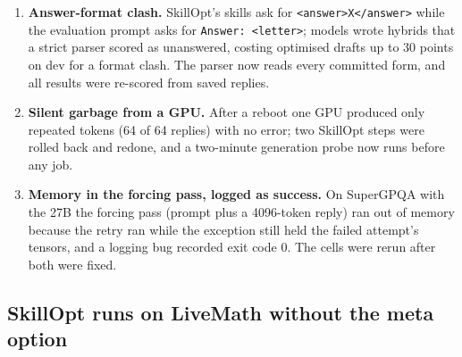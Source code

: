 \documentclass[11pt]{article}
\begin{document}
\begin{enumerate}
  \item \textbf{Answer-format clash.} SkillOpt's skills ask for \texttt{<answer>X</answer>} while the
  evaluation prompt asks for \texttt{Answer: <letter>}; models wrote hybrids that a strict parser
  scored as unanswered, costing optimised drafts up to 30 points on dev for a format clash. The
  parser now reads every committed form, and all results were re-scored from saved replies.
  \item \textbf{Silent garbage from a GPU.} After a reboot one GPU produced only repeated tokens
  (64 of 64 replies) with no error; two SkillOpt steps were rolled back and redone, and a two-minute
  generation probe now runs before any job.
  \item \textbf{Memory in the forcing pass, logged as success.} On SuperGPQA with the 27B the forcing
  pass (prompt plus a 4096-token reply) ran out of memory because the retry ran while the exception
  still held the failed attempt's tensors, and a logging bug recorded exit code 0. The cells were
  rerun after both were fixed.
\end{enumerate}

\subsection{SkillOpt runs on LiveMath without the meta option}
\label{app:skillopt}
\end{document}
